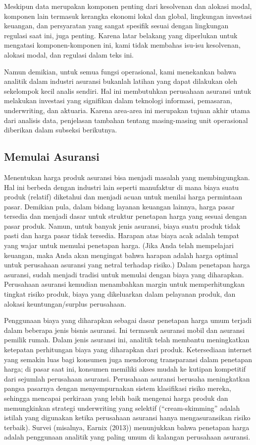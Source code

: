 \documentclass[
]{book}
\begin{document}
Meskipun data merupakan komponen penting dari kesolvenan dan alokasi modal, komponen lain termasuk kerangka ekonomi lokal dan global, lingkungan investasi keuangan, dan persyaratan yang sangat spesifik sesuai dengan lingkungan regulasi saat ini, juga penting. Karena latar belakang yang diperlukan untuk mengatasi komponen-komponen ini, kami tidak membahas isu-isu kesolvenan, alokasi modal, dan regulasi dalam teks ini.

Namun demikian, untuk semua fungsi operasional, kami menekankan bahwa analitik dalam industri asuransi bukanlah latihan yang dapat dilakukan oleh sekelompok kecil analis sendiri. Hal ini membutuhkan perusahaan asuransi untuk melakukan investasi yang signifikan dalam teknologi informasi, pemasaran, underwriting, dan aktuaria. Karena area-area ini merupakan tujuan akhir utama dari analisis data, penjelasan tambahan tentang masing-masing unit operasional diberikan dalam subseksi berikutnya.

\hypertarget{memulai-asuransi}{%
\subsection{Memulai Asuransi}\label{memulai-asuransi}}

Menentukan harga produk asuransi bisa menjadi masalah yang membingungkan. Hal ini berbeda dengan industri lain seperti manufaktur di mana biaya suatu produk (relatif) diketahui dan menjadi acuan untuk menilai harga permintaan pasar. Demikian pula, dalam bidang layanan keuangan lainnya, harga pasar tersedia dan menjadi dasar untuk struktur penetapan harga yang sesuai dengan pasar produk. Namun, untuk banyak jenis asuransi, biaya suatu produk tidak pasti dan harga pasar tidak tersedia. Harapan atas biaya acak adalah tempat yang wajar untuk memulai penetapan harga. (Jika Anda telah mempelajari keuangan, maka Anda akan mengingat bahwa harapan adalah harga optimal untuk perusahaan asuransi yang netral terhadap risiko.) Dalam penetapan harga asuransi, sudah menjadi tradisi untuk memulai dengan biaya yang diharapkan. Perusahaan asuransi kemudian menambahkan margin untuk memperhitungkan tingkat risiko produk, biaya yang dikeluarkan dalam pelayanan produk, dan alokasi keuntungan/surplus perusahaan.

Penggunaan biaya yang diharapkan sebagai dasar penetapan harga umum terjadi dalam beberapa jenis bisnis asuransi. Ini termasuk asuransi mobil dan asuransi pemilik rumah. Dalam jenis asuransi ini, analitik telah membantu meningkatkan ketepatan perhitungan biaya yang diharapkan dari produk. Ketersediaan internet yang semakin luas bagi konsumen juga mendorong transparansi dalam penetapan harga; di pasar saat ini, konsumen memiliki akses mudah ke kutipan kompetitif dari sejumlah perusahaan asuransi. Perusahaan asuransi berusaha meningkatkan pangsa pasarnya dengan menyempurnakan sistem klasifikasi risiko mereka, sehingga mencapai perkiraan yang lebih baik mengenai harga produk dan memungkinkan strategi underwriting yang selektif (``cream-skimming'' adalah istilah yang digunakan ketika perusahaan asuransi hanya mengasuransikan risiko terbaik). Survei (misalnya, Earnix (2013)) menunjukkan bahwa penetapan harga adalah penggunaan analitik yang paling umum di kalangan perusahaan asuransi.
\end{document}
